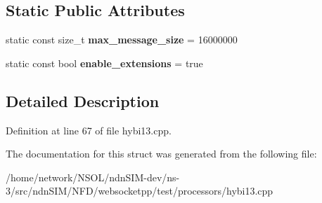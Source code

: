 \subsection*{Static Public Attributes}
\begin{DoxyCompactItemize}
\item 
static const size\+\_\+t {\bfseries max\+\_\+message\+\_\+size} = 16000000\hypertarget{structstub__config__ext_abd69405667bf978b87f3345c442b87ff}{}\label{structstub__config__ext_abd69405667bf978b87f3345c442b87ff}

\item 
static const bool {\bfseries enable\+\_\+extensions} = true\hypertarget{structstub__config__ext_ac0289e7c8826c2e74dcd33bda97dbf87}{}\label{structstub__config__ext_ac0289e7c8826c2e74dcd33bda97dbf87}

\end{DoxyCompactItemize}


\subsection{Detailed Description}


Definition at line 67 of file hybi13.\+cpp.



The documentation for this struct was generated from the following file\+:\begin{DoxyCompactItemize}
\item 
/home/network/\+N\+S\+O\+L/ndn\+S\+I\+M-\/dev/ns-\/3/src/ndn\+S\+I\+M/\+N\+F\+D/websocketpp/test/processors/hybi13.\+cpp\end{DoxyCompactItemize}
